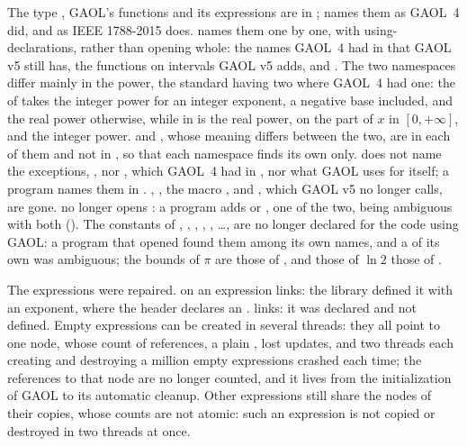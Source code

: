 \documentclass[12pt,a4paper,twoside,openright]{book}
\begin{document}
The type , GAOL's functions and its expressions are in
;  names them as GAOL~4 did, and
 as IEEE 1788-2015 does.\newinvfive{}  names
them one by one, with using-declarations, rather than opening
 whole: the names GAOL~4 had in  that GAOL v5
still has, the functions on intervals GAOL v5 adds, 
and . The two namespaces differ mainly in the power,
the standard having two where GAOL~4 had one: the  of 
takes the integer power for an integer exponent, a negative base included,
and the real power otherwise, while in   is
the real power, on the part of $x$ in $[0, +\infty]$, and  the
integer power.  and , whose meaning differs
between the two, are in each of them and not in , so that
each namespace finds its own only.  does not name the exceptions,
,  nor , which
GAOL~4 had in , nor what GAOL uses for itself; a program names
them in . , ,
the macro ,  and
, which GAOL v5 no longer calls, are gone.
 no longer opens : a program adds  or , one of the two,
 being ambiguous with both (). The
 constants of , ,
, , , \ldots, are no longer
declared for the code using GAOL: a program that opened  found
them among its own names, and a  of its own was ambiguous; the
bounds of $\pi$ are those of , and those of $\ln 2$
those of .

\medskip
The expressions were repaired.\newinvfive{}  on an
expression links: the library defined it with an 
exponent, where the header declares an . 
links: it was declared and not defined. Empty expressions can be created in
several threads: they all point to one node, whose count of references, a
plain , lost updates, and two threads each creating and
destroying a million empty expressions crashed each time; the references to
that node are no longer counted, and it lives from the initialization of GAOL
to its automatic cleanup. Other expressions still share the nodes of their
copies, whose counts are not atomic: such an expression is not copied or
destroyed in two threads at once.
\end{document}
